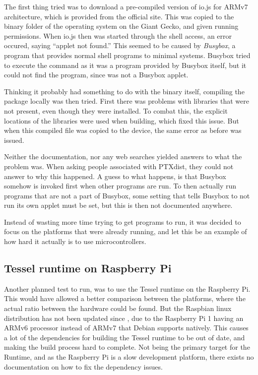 The first thing tried was to download a pre-compiled version of io.js for ARMv7 architecture, which is provided from the official site.
This was copied to the binary folder of the operating system on the Giant Gecko, and given running permissions.
When io.js then was started through the shell access, an error occured, saying ``applet not found.''
This seemed to be caused by \emph{Busybox}, a program that provides normal shell programs to minimal systems.
Busybox tried to execute the command as it was a program provided by Busybox itself, but it could not find the program, since was not a Busybox applet.

Thinking it probably had something to do with the binary itself, compiling the package locally was then tried.
First there was problems with libraries that were not present, even though they were installed.
To combat this, the explicit locations of the libraries were used when building, which fixed this issue.
But when this compiled file was copied to the device, the same error as before was issued.

Neither the documentation, nor any web searches yielded answers to what the problem was.
When asking people associated with PTXdist, they could not answer to why this happened.
A guess to what happens, is that Busybox somehow is invoked first when other programs are run.
To then actually run programs that are not a part of Busybox, some setting that tells Busybox to not run its own applet must be set, but this is then not documented anywhere.

Instead of wasting more time trying to get programs to run, it was decided to focus on the platforms that were already running, and let this be an example of how hard it actually is to use microcontrollers.

\subsection{Tessel runtime on Raspberry Pi}
Another planned test to run, was to use the Tessel runtime on the Raspberry Pi.
This would have allowed a better comparison between the platforms, where the actual ratio between the hardware could be found.
But the Raspbian linux distribution has not been updated since , due to the Raspberry Pi 1 having an ARMv6 processor instead of ARMv7 that Debian supports natively.
This causes a lot of the dependencies for building the Tessel runtime to be out of date, and making the build process hard to complete.
Not being the primary target for the Runtime, and as the Raspberry Pi is a slow development platform, there exists no documentation on how to fix the dependency issues.

